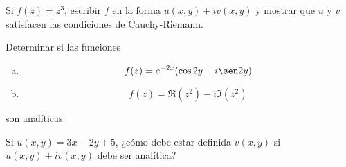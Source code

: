 \documentclass[11pt]{article}
\begin{document}
\begin{question} %
    Si $f(z) = z^3$, escribir $f$ en la forma $u(x, y) + i v(x,y)$ y mostrar que $u$ y $v$ satisfacen las condiciones de Cauchy-Riemann.
\end{question}

\begin{question} %
    Determinar si las funciones
    \begin{enumerate}[a)]
     \item \[ f(z ) = e^{-2x} (\cos 2y - i \sen 2y) \]
     \item \[ f(z) = \Re(z^2) - i \Im(z^2) \]
    \end{enumerate}
    son analíticas.
\end{question}

\begin{question} %
    Si $u(x, y) = 3 x - 2 y + 5$, ¿cómo debe estar definida $v(x, y)$ si $u(x, y) + i v(x, y)$ debe ser analítica?
\end{question}
\end{document}
